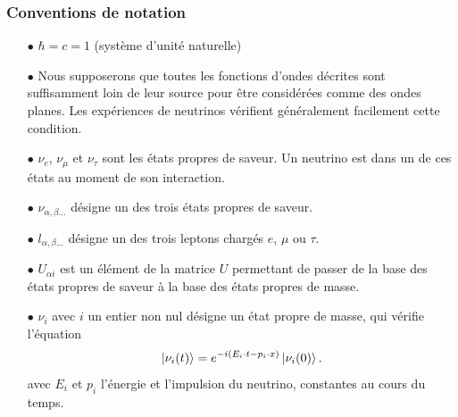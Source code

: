             \subsubsection{Conventions de notation}
            \begin{itemize}
                \item[$\bullet$] $\hbar = c = 1$ (système d'unité naturelle)
                \item[$\bullet$] Nous supposerons que toutes les fonctions d'ondes décrites sont suffisamment loin de leur source pour être considérées comme des ondes planes. Les expériences de neutrinos vérifient généralement facilement cette condition.
                \item[$\bullet$] $\nu_e$, $\nu_{\mu}$ et $\nu_{\tau}$ sont les états propres de saveur. Un neutrino est dans un de ces états au moment de son interaction.
                \item[$\bullet$] $\nu_{\alpha,\beta...}$ désigne un des trois états propres de saveur.
                \item[$\bullet$] $l_{\alpha,\beta...}$ désigne un des trois leptons chargés $e$, $\mu$ ou $\tau$.
                \item[$\bullet$] $U_{\alpha i}$ est un élément de la matrice $U$ permettant de passer de la base des états propres de saveur à la base des états propres de masse.
                \item[$\bullet$] $\nu_{i}$ avec $i$ un entier non nul désigne un état propre de masse, qui vérifie l'équation
                \begin{equation}
                    \ket{\nu_i(t)} = e^{-i(E_i\cdot t - p_i\cdot x)}\ket{\nu_i(0)}.
                \end{equation}
                avec $E_i$ et $p_i$ l'énergie et l'impulsion du neutrino, constantes au cours du temps.
            \end{itemize}
            
